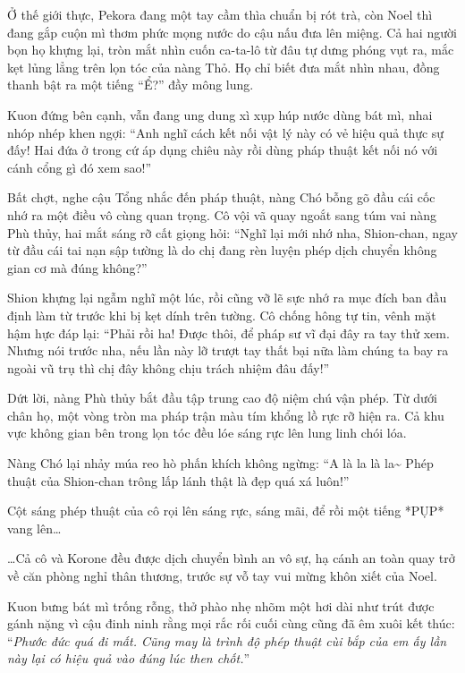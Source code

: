 \documentclass[../main.tex]{subfiles}
\begin{document}
Ở thế giới thực, Pekora đang một tay cầm thìa chuẩn bị rót trà, còn Noel thì đang gắp cuộn mì thơm phức mọng nước do cậu nấu đưa lên miệng. Cả hai người bọn họ khựng lại, tròn mắt nhìn cuốn ca-ta-lô từ đâu tự dưng phóng vụt ra, mắc kẹt lủng lẳng trên lọn tóc của nàng Thỏ. Họ chỉ biết đưa mắt nhìn nhau, đồng thanh bật ra một tiếng ``Ể?'' đầy mông lung.

Kuon đứng bên cạnh, vẫn đang ung dung xì xụp húp nước dùng bát mì, nhai nhóp nhép khen ngợi: ``Anh nghĩ cách kết nối vật lý này có vẻ hiệu quả thực sự đấy! Hai đứa ở trong cứ áp dụng chiêu này rồi dùng pháp thuật kết nối nó với cánh cổng gì đó xem sao!''

Bất chợt, nghe cậu Tổng nhắc đến pháp thuật, nàng Chó bỗng gõ đầu cái cốc nhớ ra một điều vô cùng quan trọng. Cô vội vã quay ngoắt sang túm vai nàng Phù thủy, hai mắt sáng rỡ cất giọng hỏi: ``Nghĩ lại mới nhớ nha, Shion-chan, ngay từ đầu cái tai nạn sập tường là do chị đang rèn luyện phép dịch chuyển không gian cơ mà đúng không?''

Shion khựng lại ngẫm nghĩ một lúc, rồi cũng vỡ lẽ sực nhớ ra mục đích ban đầu định làm từ trước khi bị kẹt dính trên tường. Cô chống hông tự tin, vênh mặt hậm hực đáp lại: ``Phải rồi ha! Được thôi, để pháp sư vĩ đại đây ra tay thử xem. Nhưng nói trước nha, nếu lần này lỡ trượt tay thất bại nữa làm chúng ta bay ra ngoài vũ trụ thì chị đây không chịu trách nhiệm đâu đấy!''


Dứt lời, nàng Phù thủy bắt đầu tập trung cao độ niệm chú vận phép. Từ dưới chân họ, một vòng tròn ma pháp trận màu tím khổng lồ rực rỡ hiện ra. Cả khu vực không gian bên trong lọn tóc đều lóe sáng rực lên lung linh chói lóa.

Nàng Chó lại nhảy múa reo hò phấn khích không ngừng: ``A là la là la\~{} Phép thuật của Shion-chan trông lấp lánh thật là đẹp quá xá luôn!''

Cột sáng phép thuật của cô rọi lên sáng rực, sáng mãi, để rồi một tiếng *PỤP* vang lên\dots

\ct

\dots Cả cô và Korone đều được dịch chuyển bình an vô sự, hạ cánh an toàn quay trở về căn phòng nghỉ thân thương, trước sự vỗ tay vui mừng khôn xiết của Noel.

Kuon bưng bát mì trống rỗng, thở phào nhẹ nhõm một hơi dài như trút được gánh nặng vì cậu đinh ninh rằng mọi rắc rối cuối cùng cũng đã êm xuôi kết thúc: ``\textit{Phước đức quá đi mất. Cũng may là trình độ phép thuật cùi bắp của em ấy lần này lại có hiệu quả vào đúng lúc then chốt.}''
\end{document}
